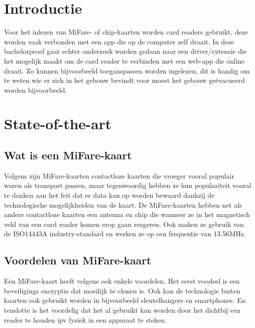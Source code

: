 \documentclass{hogent-article}
\affiliation{
  \textsuperscript{1} \href{mailto:wout.demaeseneer@student.hogent.be}{mailto:wout.demaeseneer@student.hogent.be}}
\begin{document}
\flushbottom %
\maketitle %
\tableofcontents %
\thispagestyle{empty} %


\section{Introductie}
Voor het inlezen van MiFare- of chip-kaarten worden card readers gebruikt, deze worden vaak verbonden met een app die op de computer zelf draait. In deze bachelorproef gaat echter onderzoek worden gedaan naar een driver/extensie die het mogelijk maakt om de card reader te verbinden met een web-app die online draait. Zo kunnen bijvoorbeeld toeganspassen worden ingelezen, dit is handig om te weten wie er zich in het gebouw bevindt voor moest het gebouw geëvacueerd worden bijvoorbeeld.

\section{State-of-the-art}
\subsection{Wat is een MiFare-kaart}
Volgens \textcite{Digitalid} zijn MiFare-kaarten contactloze kaarten die vroeger vooral populair waren als transport passen, maar tegenwoordig hebben ze hun populariteit vooral te danken aan het feit dat er data kan op worden bewaard dankzij de technologische mogelijkheiden van de kaart.
De MiFare-kaarten hebben net als andere contactloze kaarten een antenna en chip die wanneer ze in het magnetisch veld van een card reader komen erop gaan reageren. Ook maken ze gebruik van de ISO14443A industry-standard en werken ze op een frequentie van 13.56MHz.

\subsection{Voordelen van MiFare-kaart}
Een MiFare-kaart heeft volgens \textcite{Digitalid} ook enkele voordelen. Het eerst voodeel is een beveiligings encryptie dat moeilijk te clonen is. Ook kan de technologie buiten kaarten ook gebruikt worden in bijvoorbeeld sleutelhangers en smartphones. En tenslotte is het voordelig dat het al gebruikt kan worden door het dichtbij een reader te houden ipv fysiek in een apparaat te steken.
\end{document}

